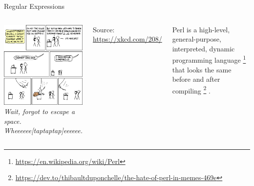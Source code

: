 \newcommand{\rx}[1]{\texttt{"{\color{olive}#1}"}}
\newcommand{\match}[1]{{\color{blue}#1}}
\newcommand{\qtt}[1]{\texttt{"{#1}"}}


\begin{frame}[t,plain]
\titlepage
\end{frame}


\begin{frame}[fragile]{Regular Expressions}
%
\begin{center}
\begin{columns}
\includegraphics[width=\linewidth]{./gfx/19-xkcd-regular_expressions}
%
\emph{Wait, forgot to escape a space.} \\
\emph{Wheeeeee[taptaptap]eeeeee.}

\vspace{6pt}
Source: \url{https://xkcd.com/208/}

\begin{hintbox}[Perl]
\footnotesize
Perl is a high-level, general-purpose, interpreted, dynamic programming language%
\footnote{\tiny\url{https://en.wikipedia.org/wiki/Perl}}
that looks the same before and after compiling%
\footnote{\tiny\url{https://dev.to/thibaultduponchelle/the-hate-of-perl-in-memes-469e}}%
.
\end{hintbox}
\end{columns}
\end{center}
%
\end{frame}

